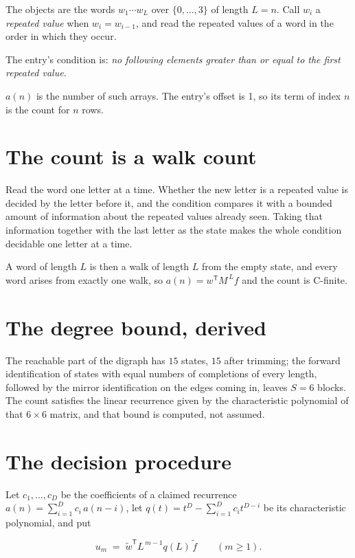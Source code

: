 \documentclass[11pt]{article}
\theoremstyle{definition}
\begin{document}
The objects are the words $w_1\cdots w_L$ over $\{0,\dots,3\}$ of length $L = n$. Call $w_i$ a {\itshape repeated value} when $w_i = w_{i-1}$, and read the repeated values of a word in the order in which they occur.

The entry's condition is: {\itshape no following elements greater than or equal to the first repeated value}.

$a(n)$ is the number of such arrays. The entry's offset is 1, so its term of index $n$ is the count for $n$ rows.

\section{The count is a walk count}

Read the word one letter at a time. Whether the new letter is a repeated value is decided by the letter before it, and the condition compares it with a bounded amount of information about the repeated values already seen. Taking that information together with the last letter as the state makes the whole condition decidable one letter at a time.

A word of length $L$ is then a walk of length $L$ from the empty state, and every word arises from exactly one walk, so $a(n) = w^{\mathsf T}M^{\,L}f$ and the count is C-finite.

\section{The degree bound, derived}

The reachable part of the digraph has $15$ states, $15$ after trimming; the forward identification of states with equal numbers of completions of every length, followed by the mirror identification on the edges coming in, leaves $S = 6$ blocks. The count satisfies the linear recurrence given by the characteristic polynomial of that $6\times6$ matrix, and that bound is computed, not assumed.

\section{The decision procedure}

Let $c_1,\dots,c_D$ be the coefficients of a claimed recurrence $a(n) = \sum_{i=1}^{D} c_i\,a(n-i)$, let $q(t) = t^{D} - \sum_{i=1}^{D} c_i t^{D-i}$ be its characteristic polynomial, and put

\[u_m \;=\; \tilde w^{\mathsf T} L^{\,m-1} q(L)\,\tilde f \qquad (m \ge 1).\]
\end{document}
